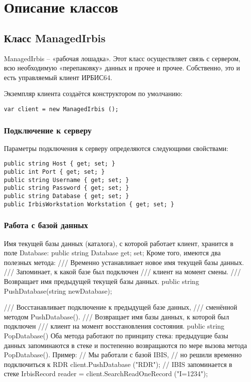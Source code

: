 \chapter{Описание классов}

\section{Класс ManagedIrbis}

ManagedIrbis – «рабочая лошадка». Этот класс осуществляет связь с сервером, всю необходимую «перепаковку» данных и прочее и прочее. Собственно, это и есть управляемый клиент ИРБИС64.

Экземпляр клиента создаётся конструктором по умолчанию:
\begin{lstlisting}
var client = new ManagedIrbis ();
\end{lstlisting}

\subsection{Подключение к серверу}

Параметры подключения к серверу определяются следующими свойствами:

\begin{lstlisting}
public string Host { get; set; }
public int Port { get; set; }
public string Username { get; set; }
public string Password { get; set; }
public string Database { get; set; }
public IrbisWorkstation Workstation { get; set; }
\end{lstlisting}

\subsection{Работа с базой данных}

Имя текущей базы данных (каталога), с которой работает клиент, хранится в поле Database: 
public string Database { get; set; }
Кроме того, имеются два полезных метода: 
/// Временно устанавливает новое имя текущей базы данных.
/// Запоминает, к какой базе был подключен
/// клиент на момент смены.
/// Возвращает имя предыдущей текущей базы данных.
public string PushDatabase(string newDatabase);

/// Восстанавливает подключение к предыдущей базе данных,
/// сменённой методом PushDatabase().
/// Возвращает имя базы данных, к которой был подключен 
/// клиент на момент восстановления состояния.
public string PopDatabase()
Оба метода работают по принципу стека: предыдущие базы данных запоминаются в стеке и постепенно возвращаются по мере вызова метода PopDatabase(). Пример: 
// Мы работали с базой IBIS, 
// но решили временно подключиться к RDR
client.PushDatabase ("RDR"); // IBIS запоминается в стеке
IrbisRecord reader = client.SearchReadOneRecord ("I=1234");

